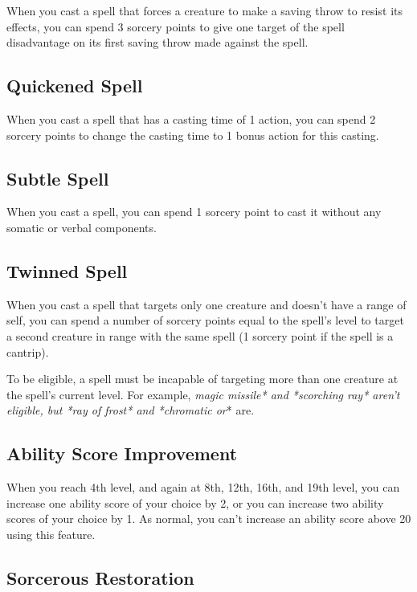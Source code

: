When you cast a spell that forces a creature to make a saving throw to resist its effects, you can spend 3 sorcery points to give one target of the spell disadvantage on its first saving throw made against the spell.

\subsection{Quickened Spell}

When you cast a spell that has a casting time of 1 action, you can spend 2 sorcery points to change the casting time to 1 bonus action for this casting.

\subsection{Subtle Spell}

When you cast a spell, you can spend 1 sorcery point to cast it without any somatic or verbal components.

\subsection{Twinned Spell}

When you cast a spell that targets only one creature and doesn't have a range of self, you can spend a number of sorcery points equal to the spell's level to target a second creature in range with the same spell (1 sorcery point if the spell is a cantrip).

To be eligible, a spell must be incapable of targeting more than one creature at the spell's current level. For example, \textit{magic missile* and *scorching ray* aren't eligible, but *ray of frost* and *chromatic or}* are.

\subsection{Ability Score Improvement}

When you reach 4th level, and again at 8th, 12th, 16th, and 19th level, you can increase one ability score of your choice by 2, or you can increase two ability scores of your choice by 1. As normal, you can't increase an ability score above 20 using this feature.

\subsection{Sorcerous Restoration}

